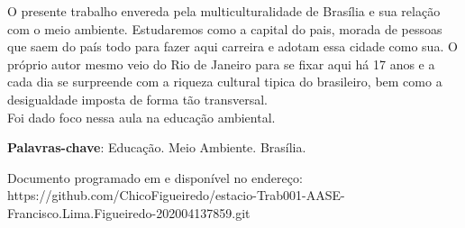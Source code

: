 
\setlength{\absparsep}{18pt} %
\begin{resumo}
 O presente trabalho envereda pela multiculturalidade de Brasília e sua relação com o meio ambiente. Estudaremos como a capital do pais, morada de pessoas que saem do país todo para fazer aqui carreira e adotam essa cidade como sua. O próprio autor mesmo veio do Rio de Janeiro para se fixar aqui há 17 anos e a cada dia se surpreende com a riqueza cultural tipica do brasileiro, bem como a desigualdade imposta de forma tão transversal. \\
 Foi dado foco nessa aula na educação ambiental.

 \textbf{Palavras-chave}: Educação. Meio Ambiente. Brasília.
\end{resumo}

Documento programado em \LaTex e disponível no endereço: https://github.com/ChicoFigueiredo/estacio-Trab001-AASE-Francisco.Lima.Figueiredo-202004137859.git
